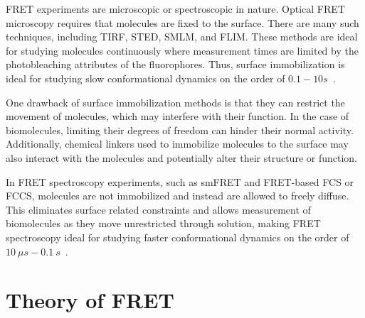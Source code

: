 FRET experiments are microscopic or spectroscopic in nature.
Optical FRET microscopy requires that molecules are fixed to the surface.
There are many such techniques, including \ac{TIRF}, \ac{STED}, \ac{SMLM}, and \ac{FLIM}. 
These methods are ideal for studying molecules continuously where measurement times are limited by the photobleaching attributes of the fluorophores.  
Thus, surface immobilization is ideal for studying slow conformational dynamics on the order of $0.1 - 10 s$~\cite{lerner_Science_2018}.

One drawback of surface immobilization methods is that they can restrict the movement of molecules, which may interfere with their function. 
In the case of biomolecules, limiting their degrees of freedom can hinder their normal activity. 
Additionally, chemical linkers used to immobilize molecules to the surface may also interact with the molecules and potentially alter their structure or function. 

In FRET spectroscopy experiments, such as \ac{smFRET} and FRET-based \ac{FCS} or \ac{FCCS}, molecules are not immobilized and instead are allowed to freely diffuse.
This eliminates surface related constraints and allows measurement of biomolecules as they move unrestricted through solution, making FRET spectroscopy ideal for studying faster conformational dynamics on the order of $10~\mu s - 0.1~s$~\cite{lerner_Science_2018}. 


\section{Theory of FRET
\label{sec:FRET_theory}}

